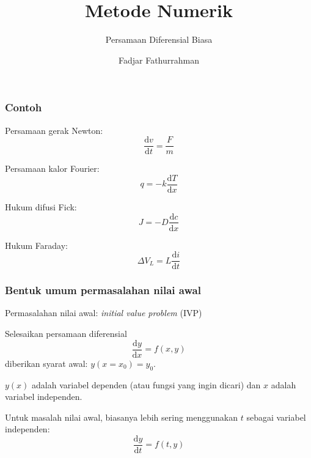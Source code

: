 



\title{Metode Numerik}
\subtitle{Persamaan Diferensial Biasa}
\author{Fadjar Fathurrahman}
\date{}


\frame{\titlepage}


\begin{frame}
\frametitle{Contoh}

Persamaan gerak Newton:
\begin{equation*}
\frac{\mathrm{d}v}{\mathrm{d}t} = \frac{F}{m}
\end{equation*}

Persamaan kalor Fourier:
\begin{equation*}
q = -k \frac{\mathrm{d}T}{\mathrm{d}x}
\end{equation*}

Hukum difusi Fick:
\begin{equation*}
J = -D \frac{\mathrm{d}c}{\mathrm{d}x}
\end{equation*}

Hukum Faraday:
\begin{equation*}
\Delta V_{L} = L \frac{\mathrm{d}i}{\mathrm{d}t}
\end{equation*}

\end{frame}


\begin{frame}
\frametitle{Bentuk umum permasalahan nilai awal}

Permasalahan nilai awal: \textit{initial value problem} (IVP)

Selesaikan persamaan diferensial
\begin{equation}
\frac{\mathrm{d}y}{\mathrm{d}x} = f(x,y)
\label{eq:ode_gen01}
\end{equation}
diberikan syarat awal: $y(x=x_0) = y_0$.

$y(x)$ adalah variabel dependen (atau fungsi yang ingin dicari)
dan $x$ adalah variabel independen.

Untuk masalah nilai awal, biasanya lebih sering menggunakan $t$ sebagai
variabel independen:
\begin{equation}
\frac{\mathrm{d}y}{\mathrm{d}t} = f(t,y)
\label{eq:ode_gen02}
\end{equation}

\end{frame}

